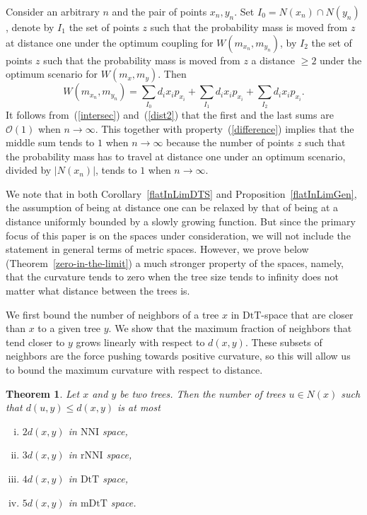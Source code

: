 \documentclass{amsart}
\newtheorem{theorem}[lemma]{Theorem}
\newcommand{\dts}{\mathrm{DtT}}
\newcommand{\nni}{\mathrm{NNI}}
\newcommand{\rnni}{\mathrm{rNNI}}
\newcommand{\mdts}{\mathrm{mDtT}}
\renewcommand{\O}{\mathcal{O}}
\begin{document}
\proof
Consider an arbitrary $n$ and the pair of points $x_n,y_n$.
Set $I_0 = N(x_n) \cap N(y_n)$, denote by $I_1$ the set of points
$z$ such that the probability mass is moved from $z$ at distance one under the
optimum coupling for $W(m_{x_n},m_{y_n})$, by $I_2$ the set of points $z$ such that
the probability mass is moved from $z$ a distance $\geq 2$ under the optimum
scenario for $W(m_x,m_y)$. Then
\[
W(m_{x_n},m_{y_n}) = \sum_{I_0} d_i x_i p_{x_i} + \sum_{I_1} d_i x_i p_{x_i} +
\sum_{I_2} d_i x_i p_{x_i}.
\]
It follows from~(\ref{intersec}) and~(\ref{dist2}) that the first and the last sums
are $\O(1)$ when $n\to\infty$. This together with property~(\ref{difference})
implies that the middle sum tends to $1$ when $n\to\infty$ because the number of
points $z$ such that the probability mass has to travel at distance one under an
optimum scenario, divided by $|N(x_n)|$, tends to $1$ when $n\to\infty$.
\endproof

We note that in both Corollary~\ref{flatInLimDTS} and Proposition~\ref{flatInLimGen}, the assumption of being at distance one can be relaxed by that of being at a distance uniformly bounded by a slowly growing function.
But since the primary focus of this paper is on the spaces under consideration, we will not  include the statement in general terms of metric spaces.
However, we prove below (Theorem~\ref{zero-in-the-limit}) a much stronger property of the spaces, namely, that the curvature tends to zero when the tree size tends to infinity does not matter what distance between the trees is.

We first bound the number of neighbors of a tree $x$ in $\dts$-space that are closer than $x$ to a given tree $y$.
We show that the maximum fraction of neighbors that tend closer to $y$ grows linearly with respect to $d(x,y)$.
These subsets of neighbors are the force pushing towards positive curvature, so this will allow us to bound the maximum curvature with respect to distance.

\begin{theorem}
\label{max_good_neighbors}
Let $x$ and $y$ be two trees.
Then the number of trees $u \in N(x)$ such that $d(u, y) \le d(x, y)$ is at most 
\begin{enumerate}[(i)]
\item $2d(x,y)$ in $\nni$ space,
\item $3d(x,y)$ in $\rnni$ space,
\item $4d(x,y)$ in $\dts$ space,
\item $5d(x,y)$ in $\mdts$ space.
\end{enumerate}
\end{theorem}
\end{document}
